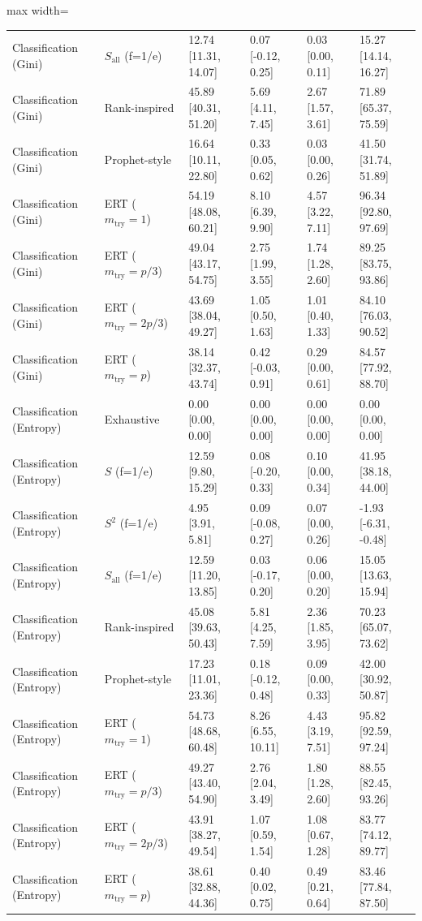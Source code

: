 \begin{table}[t]
\begin{adjustbox}{max width=\textwidth}
\begin{tabular}{llllll}
Classification (Gini) & $S_{\mathrm{all}}$ (f=1/e) & 12.74 [11.31, 14.07] & 0.07 [-0.12, 0.25] & 0.03 [0.00, 0.11] & 15.27 [14.14, 16.27] \\
Classification (Gini) & Rank-inspired & 45.89 [40.31, 51.20] & 5.69 [4.11, 7.45] & 2.67 [1.57, 3.61] & 71.89 [65.37, 75.59] \\
Classification (Gini) & Prophet-style & 16.64 [10.11, 22.80] & 0.33 [0.05, 0.62] & 0.03 [0.00, 0.26] & 41.50 [31.74, 51.89] \\
Classification (Gini) & ERT ($m_{\mathrm{try}}=1$) & 54.19 [48.08, 60.21] & 8.10 [6.39, 9.90] & 4.57 [3.22, 7.11] & 96.34 [92.80, 97.69] \\
Classification (Gini) & ERT ($m_{\mathrm{try}}=p/3$) & 49.04 [43.17, 54.75] & 2.75 [1.99, 3.55] & 1.74 [1.28, 2.60] & 89.25 [83.75, 93.86] \\
Classification (Gini) & ERT ($m_{\mathrm{try}}=2p/3$) & 43.69 [38.04, 49.27] & 1.05 [0.50, 1.63] & 1.01 [0.40, 1.33] & 84.10 [76.03, 90.52] \\
Classification (Gini) & ERT ($m_{\mathrm{try}}=p$) & 38.14 [32.37, 43.74] & 0.42 [-0.03, 0.91] & 0.29 [0.00, 0.61] & 84.57 [77.92, 88.70] \\
\midrule
Classification (Entropy) & Exhaustive & 0.00 [0.00, 0.00] & 0.00 [0.00, 0.00] & 0.00 [0.00, 0.00] & 0.00 [0.00, 0.00] \\
Classification (Entropy) & $S$ (f=1/e) & 12.59 [9.80, 15.29] & 0.08 [-0.20, 0.33] & 0.10 [0.00, 0.34] & 41.95 [38.18, 44.00] \\
Classification (Entropy) & $S^2$ (f=1/e) & 4.95 [3.91, 5.81] & 0.09 [-0.08, 0.27] & 0.07 [0.00, 0.26] & -1.93 [-6.31, -0.48] \\
Classification (Entropy) & $S_{\mathrm{all}}$ (f=1/e) & 12.59 [11.20, 13.85] & 0.03 [-0.17, 0.20] & 0.06 [0.00, 0.20] & 15.05 [13.63, 15.94] \\
Classification (Entropy) & Rank-inspired & 45.08 [39.63, 50.43] & 5.81 [4.25, 7.59] & 2.36 [1.85, 3.95] & 70.23 [65.07, 73.62] \\
Classification (Entropy) & Prophet-style & 17.23 [11.01, 23.36] & 0.18 [-0.12, 0.48] & 0.09 [0.00, 0.33] & 42.00 [30.92, 50.87] \\
Classification (Entropy) & ERT ($m_{\mathrm{try}}=1$) & 54.73 [48.68, 60.48] & 8.26 [6.55, 10.11] & 4.43 [3.19, 7.51] & 95.82 [92.59, 97.24] \\
Classification (Entropy) & ERT ($m_{\mathrm{try}}=p/3$) & 49.27 [43.40, 54.90] & 2.76 [2.04, 3.49] & 1.80 [1.28, 2.60] & 88.55 [82.45, 93.26] \\
Classification (Entropy) & ERT ($m_{\mathrm{try}}=2p/3$) & 43.91 [38.27, 49.54] & 1.07 [0.59, 1.54] & 1.08 [0.67, 1.28] & 83.77 [74.12, 89.77] \\
Classification (Entropy) & ERT ($m_{\mathrm{try}}=p$) & 38.61 [32.88, 44.36] & 0.40 [0.02, 0.75] & 0.49 [0.21, 0.64] & 83.46 [77.84, 87.50] \\
\bottomrule
\end{tabular}
\end{adjustbox}
\end{table}
